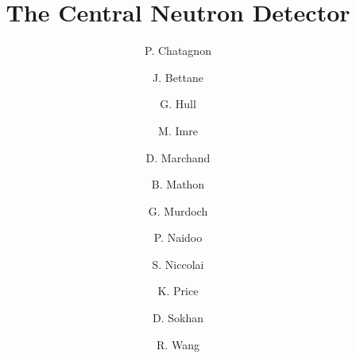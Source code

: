 \title{The Central Neutron Detector}

\author[A]{P. Chatagnon}
\author[A]{J. Bettane}
\author[A]{G. Hull}
\author[A]{M. Imre}
\author[A]{D. Marchand}
\author[A]{B. Mathon}
\author[B]{G. Murdoch}
\author[B]{P. Naidoo}
\author[A]{S. Niccolai}
\author[A]{K. Price}
\author[B]{D. Sokhan}
\author[A]{R. Wang}

\address[A]{Institut de Physique Nucl\'eaire, CNRS-IN2P3, Univ. Paris-Sud, Universit\'e Paris-Saclay, 91406 Orsay Cedex, France}
\address[B]{University of Glasgow, Glasgow G12 8QQ, United Kingdom}

